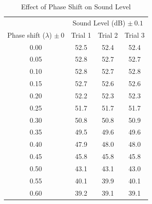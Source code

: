 \documentclass[index]{subfiles}
\begin{document}
\begin{table}[H]
    \caption{Effect of Phase Shift on Sound Level}
    \centering
    \begin{tabular}{@{}cccc@{}} \toprule
                                             & \multicolumn{3}{c}{Sound Level (dB) \(\pm\ 0.1\)}                     \\ \cmidrule(r){2-4}
        Phase shift (\(\lambda\)) \(\pm\ 0\) & Trial 1                                           & Trial 2 & Trial 3 \\ \midrule
        0.00                                 & 52.5                                              & 52.4    & 52.4    \\
        0.05                                 & 52.8                                              & 52.7    & 52.7    \\
        0.10                                 & 52.8                                              & 52.7    & 52.8    \\
        0.15                                 & 52.7                                              & 52.6    & 52.6    \\
        0.20                                 & 52.2                                              & 52.3    & 52.3    \\
        0.25                                 & 51.7                                              & 51.7    & 51.7    \\
        0.30                                 & 50.8                                              & 50.8    & 50.9    \\
        0.35                                 & 49.5                                              & 49.6    & 49.6    \\
        0.40                                 & 47.9                                              & 48.0    & 48.0    \\
        0.45                                 & 45.8                                              & 45.8    & 45.8    \\
        0.50                                 & 43.1                                              & 43.1    & 43.0    \\
        0.55                                 & 40.1                                              & 39.9    & 40.1    \\
        0.60                                 & 39.2                                              & 39.1    & 39.1    \\

\end{tabular}
\end{table}
\end{document}

